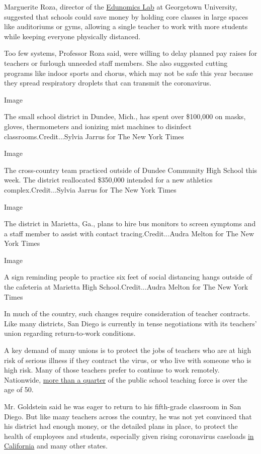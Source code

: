 Marguerite Roza, director of the
\href{https://edunomicslab.org/}{Edunomics Lab} at Georgetown
University, suggested that schools could save money by holding core
classes in large spaces like auditoriums or gyms, allowing a single
teacher to work with more students while keeping everyone physically
distanced.

Too few systems, Professor Roza said, were willing to delay planned pay
raises for teachers or furlough unneeded staff members. She also
suggested cutting programs like indoor sports and chorus, which may not
be safe this year because they spread respiratory droplets that can
transmit the coronavirus.

Image

The small school district in Dundee, Mich., has spent over \$100,000 on
masks, gloves, thermometers and ionizing mist machines to disinfect
classrooms.Credit...Sylvia Jarrus for The New York Times

Image

The cross-country team practiced outside of Dundee Community High School
this week. The district reallocated \$350,000 intended for a new
athletics complex.Credit...Sylvia Jarrus for The New York Times

Image

The district in Marietta, Ga., plans to hire bus monitors to screen
symptoms and a staff member to assist with contact
tracing.Credit...Audra Melton for The New York Times

Image

A sign reminding people to practice six feet of social distancing hangs
outside of the cafeteria at Marietta High School.Credit...Audra Melton
for The New York Times

In much of the country, such changes require consideration of teacher
contracts. Like many districts, San Diego is currently in tense
negotiations with its teachers' union regarding return-to-work
conditions.

A key demand of many unions is to protect the jobs of teachers who are
at high risk of serious illness if they contract the virus, or who live
with someone who is high risk. Many of those teachers prefer to continue
to work remotely. Nationwide,
\href{https://nces.ed.gov/pubs2020/2020142.pdf}{more than a quarter} of
the public school teaching force is over the age of 50.

Mr. Goldstein said he was eager to return to his fifth-grade classroom
in San Diego. But like many teachers across the country, he was not yet
convinced that his district had enough money, or the detailed plans in
place, to protect the health of employees and students, especially given
rising coronavirus caseloads
\href{https://www.nytimes3xbfgragh.onion/interactive/2020/us/california-coronavirus-cases.html}{in
California} and many other states.

